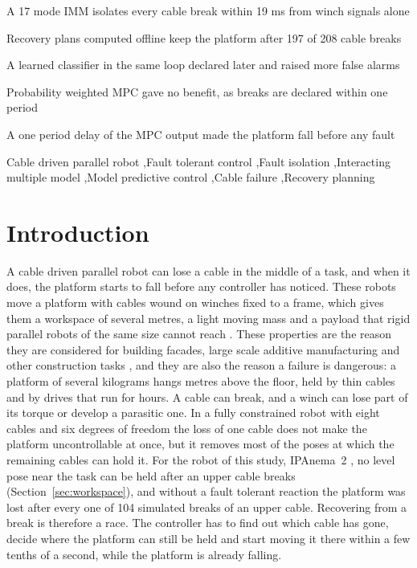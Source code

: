 \documentclass[a4paper,fleqn]{cas-dc}
\begin{document}
\begin{highlights}
\item A 17 mode IMM isolates every cable break within 19 ms from winch signals alone
\item Recovery plans computed offline keep the platform after 197 of 208 cable breaks
\item A learned classifier in the same loop declared later and raised more false alarms
\item Probability weighted MPC gave no benefit, as breaks are declared within one period
\item A one period delay of the MPC output made the platform fall before any fault
\end{highlights}

\begin{keywords}
Cable driven parallel robot \sep Fault tolerant control \sep Fault isolation \sep Interacting multiple model \sep Model predictive control \sep Cable failure \sep Recovery planning
\end{keywords}

\maketitle

\section{Introduction}\label{sec:intro}

A cable driven parallel robot can lose a cable in the middle of a task, and when it does, the platform starts to fall before any controller has noticed. These robots move a platform with cables wound on winches fixed to a frame, which gives them a workspace of several metres, a light moving mass and a payload that rigid parallel robots of the same size cannot reach \citep{pott2018book,qian2018review,tachia2026review}. These properties are the reason they are considered for building facades, large scale additive manufacturing and other construction tasks \citep{izard2017printing}, and they are also the reason a failure is dangerous: a platform of several kilograms hangs metres above the floor, held by thin cables and by drives that run for hours. A cable can break, and a winch can lose part of its torque or develop a parasitic one. In a fully constrained robot with eight cables and six degrees of freedom the loss of one cable does not make the platform uncontrollable at once, but it removes most of the poses at which the remaining cables can hold it. For the robot of this study, IPAnema~2 \citep{pott2013ipanema}, no level pose near the task can be held after an upper cable breaks (Section~\ref{sec:workspace}), and without a fault tolerant reaction the platform was lost after every one of 104 simulated breaks of an upper cable. Recovering from a break is therefore a race. The controller has to find out which cable has gone, decide where the platform can still be held and start moving it there within a few tenths of a second, while the platform is already falling.
\end{document}
